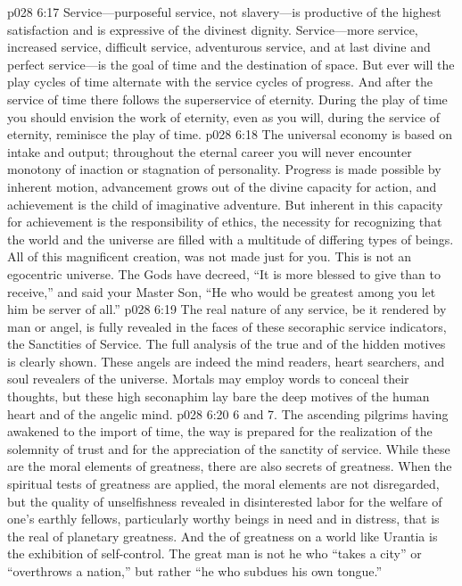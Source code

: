 \vs p028 6:17 Service---purposeful service, not slavery---is productive of the highest satisfaction and is expressive of the divinest dignity. Service---more service, increased service, difficult service, adventurous service, and at last divine and perfect service---is the goal of time and the destination of space. But ever will the play cycles of time alternate with the service cycles of progress. And after the service of time there follows the superservice of eternity. During the play of time you should envision the work of eternity, even as you will, during the service of eternity, reminisce the play of time.
\pc \vs p028 6:18 The universal economy is based on intake and output; throughout the eternal career you will never encounter monotony of inaction or stagnation of personality. Progress is made possible by inherent motion, advancement grows out of the divine capacity for action, and achievement is the child of imaginative adventure. But inherent in this capacity for achievement is the responsibility of ethics, the necessity for recognizing that the world and the universe are filled with a multitude of differing types of beings. All of this magnificent creation,  was not made just for you. This is not an egocentric universe. The Gods have decreed, “It is more blessed to give than to receive,” and said your Master Son, \textcolor{ubdarkred}{“He who would be greatest among you let him be server of all.”}
\pc \vs p028 6:19 The real nature of any service, be it rendered by man or angel, is fully revealed in the faces of these secoraphic service indicators, the Sanctities of Service. The full analysis of the true and of the hidden motives is clearly shown. These angels are indeed the mind readers, heart searchers, and soul revealers of the universe. Mortals may employ words to conceal their thoughts, but these high seconaphim lay bare the deep motives of the human heart and of the angelic mind.
\pc \vs p028 6:20 6 and 7.  The ascending pilgrims having awakened to the import of time, the way is prepared for the realization of the solemnity of trust and for the appreciation of the sanctity of service. While these are the moral elements of greatness, there are also secrets of greatness. When the spiritual tests of greatness are applied, the moral elements are not disregarded, but the quality of unselfishness revealed in disinterested labor for the welfare of one’s earthly fellows, particularly worthy beings in need and in distress, that is the real  of planetary greatness. And the  of greatness on a world like Urantia is the exhibition of self\hyp{}control. The great man is not he who “takes a city” or “overthrows a nation,” but rather “he who subdues his own tongue.”
